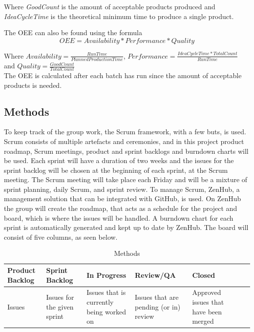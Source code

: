Where \textit{GoodCount} is the amount of acceptable products produced and
\textit{IdeaCycleTime} is the theoretical minimum time to produce a single
product.

The OEE can also be found using the formula
\[
    OEE = Availability * Performance * Quality
\]

Where \(Availability = \frac{Run Time}{Planned Production Time}\),
\(Performance = \frac{Idea Cycle Time * Total Count}{Run Time}\) and
\(Quality = \frac{Good Count}{Total Count}\) \\

The OEE is calculated after each batch has run since the amount of acceptable
products is needed.

\subsection{Methods}
To keep track of the group work, the Scrum framework, with a few buts, is used.
Scrum consists of multiple artefacts and ceremonies, and in this project product
roadmap, Scrum meetings, product and sprint backlogs and burndown charts will
be used. Each sprint will have a duration of two weeks and the issues for the
sprint backlog will be chosen at the beginning of each sprint, at the Scrum
meeting. The Scrum meeting will take place each Friday and will be a mixture of
sprint planning, daily Scrum, and sprint review. To manage Scrum, ZenHub, a
management solution that can be integrated with GitHub, is used. On ZenHub the
group will create the roadmap, that acts as a schedule for the project and
board, which is where the issues will be handled. A burndown chart for each
sprint is automatically generated and kept up to date by ZenHub. The board will
consist of five columns, as seen below.

\begin{table}[H]
    \begin{tabularx}{\textwidth}{|>{\RaggedRight}X|>{\RaggedRight}X|>{\RaggedRight}X|>{\RaggedRight}X|>{\RaggedRight}X|>{\RaggedRight}X|>{\RaggedRight}X|}
        \hline                             
        \textbf{Product Backlog} & \textbf{Sprint Backlog} & \textbf{In Progress} & \textbf{Review/QA} & \textbf{Closed} \\
        \hline
        Issues & Issues for the given sprint & Issues that is currently being worked on & Issues that are pending (or in) review & Approved issues that have been merged    \\
        \hline
    \end{tabularx}
    \caption{Methods} 
    \label{table:Methods}
\end{table} 
